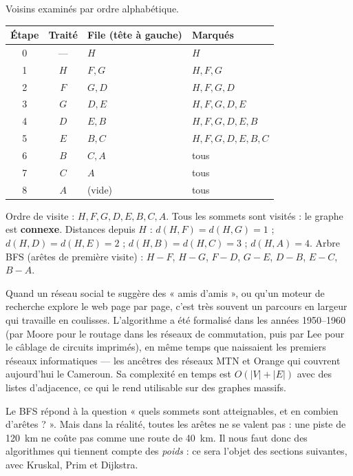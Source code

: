 \documentclass[11pt]{article}
\begin{document}
\begin{corrige}[Exercice 1]
Voisins examinés par ordre alphabétique.
\begin{center}
\begin{tabularx}{\linewidth}{|c|c|X|X|}
\hline
\rowcolor{popblueL} Étape & Traité & File (tête à gauche) & Marqués \\
\hline
0 & --- & $H$ & $H$ \\
\hline
1 & $H$ & $F, G$ & $H, F, G$ \\
\hline
2 & $F$ & $G, D$ & $H, F, G, D$ \\
\hline
3 & $G$ & $D, E$ & $H, F, G, D, E$ \\
\hline
4 & $D$ & $E, B$ & $H, F, G, D, E, B$ \\
\hline
5 & $E$ & $B, C$ & $H, F, G, D, E, B, C$ \\
\hline
6 & $B$ & $C, A$ & tous \\
\hline
7 & $C$ & $A$ & tous \\
\hline
8 & $A$ & (vide) & tous \\
\hline
\end{tabularx}
\end{center}
Ordre de visite : $H, F, G, D, E, B, C, A$. Tous les sommets sont visités : le graphe est \textbf{connexe}.
Distances depuis $H$ : $d(H,F)=d(H,G)=1$ ; $d(H,D)=d(H,E)=2$ ; $d(H,B)=d(H,C)=3$ ; $d(H,A)=4$.
Arbre BFS (arêtes de première visite) : $H\!-\!F$, $H\!-\!G$, $F\!-\!D$, $G\!-\!E$, $D\!-\!B$, $E\!-\!C$, $B\!-\!A$.
\end{corrige}

\begin{savaistu}
Quand un réseau social te suggère des « amis d'amis », ou qu'un moteur de recherche explore le web page par page, c'est très souvent un parcours en largeur qui travaille en coulisses. L'algorithme a été formalisé dans les années 1950--1960 (par Moore pour le routage dans les réseaux de commutation, puis par Lee pour le câblage de circuits imprimés), en même temps que naissaient les premiers réseaux informatiques — les ancêtres des réseaux MTN et Orange qui couvrent aujourd'hui le Cameroun. Sa complexité en temps est $O(|V|+|E|)$ avec des listes d'adjacence, ce qui le rend utilisable sur des graphes massifs.
\end{savaistu}

Le BFS répond à la question « quels sommets sont atteignables, et en combien d'arêtes ? ». Mais dans la réalité, toutes les arêtes ne se valent pas : une piste de \SI{120}{km} ne coûte pas comme une route de \SI{40}{km}. Il nous faut donc des algorithmes qui tiennent compte des \emph{poids} : ce sera l'objet des sections suivantes, avec Kruskal, Prim et Dijkstra.
\end{document}

